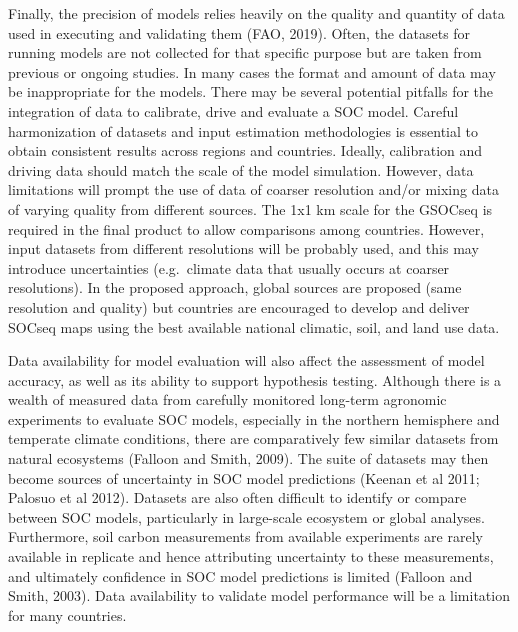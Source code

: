 \documentclass[
  10pt,
  b5paper,
]{book}
\begin{document}
Finally, the precision of models relies heavily on the quality and quantity of data used in executing and validating them (FAO, 2019). Often, the datasets for running models are not collected for that specific purpose but are taken from previous or ongoing studies. In many cases the format and amount of data may be inappropriate for the models. There may be several potential pitfalls for the integration of data to calibrate, drive and evaluate a SOC model. Careful harmonization of datasets and input estimation methodologies is essential to obtain consistent results across regions and countries. Ideally, calibration and driving data should match the scale of the model simulation. However, data limitations will prompt the use of data of coarser resolution and/or mixing data of varying quality from different sources. The 1x1 km scale for the GSOCseq is required in the final product to allow comparisons among countries. However, input datasets from different resolutions will be probably used, and this may introduce uncertainties (e.g.~climate data that usually occurs at coarser resolutions). In the proposed approach, global sources are proposed (same resolution and quality) but countries are encouraged to develop and deliver SOCseq maps using the best available national climatic, soil, and land use data.

Data availability for model evaluation will also affect the assessment of model accuracy, as well as its ability to support hypothesis testing. Although there is a wealth of measured data from carefully monitored long-term agronomic experiments to evaluate SOC models, especially in the northern hemisphere and temperate climate conditions, there are comparatively few similar datasets from natural ecosystems (Falloon and Smith, 2009). The suite of datasets may then become sources of uncertainty in SOC model predictions (Keenan et al 2011; Palosuo et al 2012). Datasets are also often difficult to identify or compare between SOC models, particularly in large-scale ecosystem or global analyses. Furthermore, soil carbon measurements from available experiments are rarely available in replicate and hence attributing uncertainty to these measurements, and ultimately confidence in SOC model predictions is limited (Falloon and Smith, 2003). Data availability to validate model performance will be a limitation for many countries.
\end{document}
